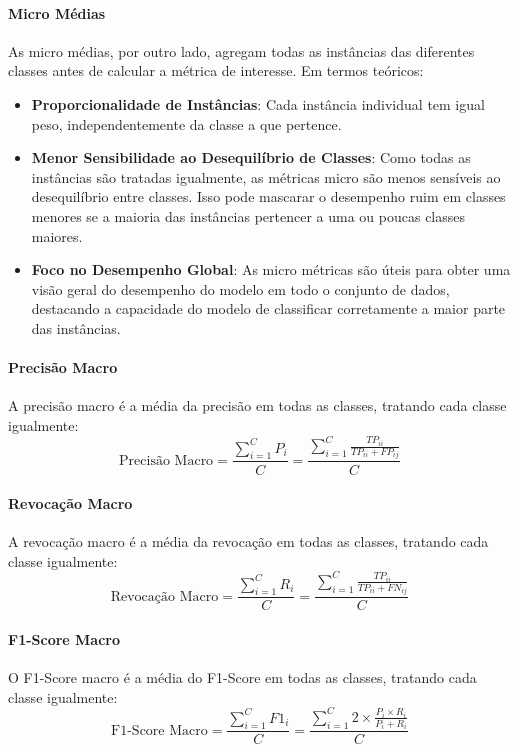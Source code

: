 \paragraph{Micro Médias}
As micro médias, por outro lado, agregam todas as instâncias das diferentes classes antes de calcular a métrica de interesse. Em termos teóricos:

\begin{itemize}
    \item \textbf{Proporcionalidade de Instâncias}: Cada instância individual tem igual peso, independentemente da classe a que pertence.
    \item \textbf{Menor Sensibilidade ao Desequilíbrio de Classes}: Como todas as instâncias são tratadas igualmente, as métricas micro são menos sensíveis ao desequilíbrio entre classes. Isso pode mascarar o desempenho ruim em classes menores se a maioria das instâncias pertencer a uma ou poucas classes maiores.
    \item \textbf{Foco no Desempenho Global}: As micro métricas são úteis para obter uma visão geral do desempenho do modelo em todo o conjunto de dados, destacando a capacidade do modelo de classificar corretamente a maior parte das instâncias.
\end{itemize}

\paragraph{Precisão Macro}
A precisão macro é a média da precisão em todas as classes, tratando cada classe igualmente:
\[ \text{Precisão Macro} = \frac{\sum_{i=1}^{C} P_i}{C} = \frac{\sum_{i=1}^{C} \frac{TP_{ii}}{TP_{ii} + FP_{ij}}}{C} \]

\paragraph{Revocação Macro}
A revocação macro é a média da revocação em todas as classes, tratando cada classe igualmente:
\[ \text{Revocação Macro} = \frac{\sum_{i=1}^{C} R_i}{C} = \frac{\sum_{i=1}^{C} \frac{TP_{ii}}{TP_{ii} + FN_{ij}}}{C} \]

\paragraph{F1-Score Macro}
O F1-Score macro é a média do F1-Score em todas as classes, tratando cada classe igualmente:
\[ \text{F1-Score Macro} = \frac{\sum_{i=1}^{C} F1_i}{C} = \frac{\sum_{i=1}^{C} 2 \times \frac{P_i \times R_i}{P_i + R_i}}{C} \]

